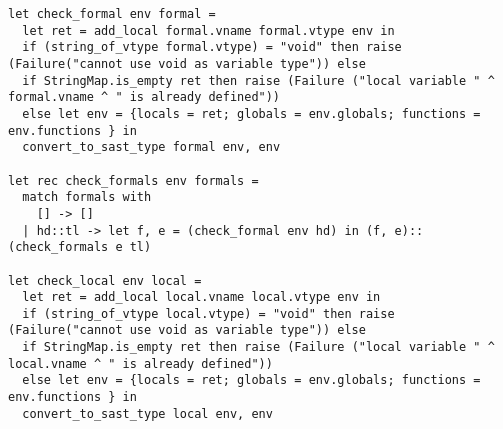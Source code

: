 \documentclass[11pt]{article}
\begin{document}
\begin{listing}[H]
\begin{verbatim}
let check_formal env formal =
  let ret = add_local formal.vname formal.vtype env in
  if (string_of_vtype formal.vtype) = "void" then raise (Failure("cannot use void as variable type")) else
  if StringMap.is_empty ret then raise (Failure ("local variable " ^ formal.vname ^ " is already defined"))
  else let env = {locals = ret; globals = env.globals; functions = env.functions } in
  convert_to_sast_type formal env, env

let rec check_formals env formals =
  match formals with
    [] -> []
  | hd::tl -> let f, e = (check_formal env hd) in (f, e)::(check_formals e tl)

let check_local env local =
  let ret = add_local local.vname local.vtype env in
  if (string_of_vtype local.vtype) = "void" then raise (Failure("cannot use void as variable type")) else
  if StringMap.is_empty ret then raise (Failure ("local variable " ^ local.vname ^ " is already defined"))
  else let env = {locals = ret; globals = env.globals; functions = env.functions } in
  convert_to_sast_type local env, env
  \end{verbatim}
\end{listing}
\end{document}
